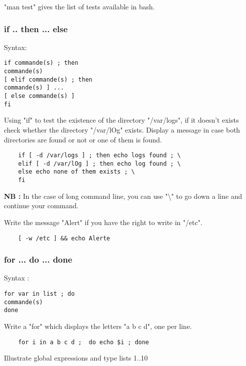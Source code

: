 \documentclass[11pt]{article}
\begin{document}
"man test" gives the list of tests available in bash.

\subsubsection{if .. then ... else}

Syntax:

\begin{verbatim}
if commande(s) ; then
commande(s)
[ elif commande(s) ; then
commande(s) ] ...
[ else commande(s) ]
fi
\end{verbatim}

Using "if" to test the existence of the directory "/var/logs", if it doesn't exists check whether the directory "/var/lOg" exists.  Display a message in case both directories are found or not or one of them is found.

\begin{solution}
	\begin{verbatim}
	if [ -d /var/logs ] ; then echo logs found ; \
	elif [ -d /var/lOg ] ; then echo log found ; \
	else echo none of them exists ; \
	fi
	\end{verbatim}
\end{solution}

\textbf{NB :} In the case of long command line, you can use "\textbackslash{}" to go down a line and continue your command.

Write the message "Alert" if you have the right to write in "/etc".

\begin{solution}
	\begin{lstlisting}
	[ -w /etc ] && echo Alerte
	\end{lstlisting}
\end{solution}

\subsubsection{for ...  do ... done}

Syntax :

\begin{verbatim}
for var in list ; do
commande(s)
done
\end{verbatim}
Write a "for" which displays the letters "a b c d", one per line.

\begin{solution}
	\begin{verbatim}
	for i in a b c d ;  do echo $i ; done
	\end{verbatim}
	Illustrate global expressions and type lists {1..10}
\end{solution}
\end{document}
